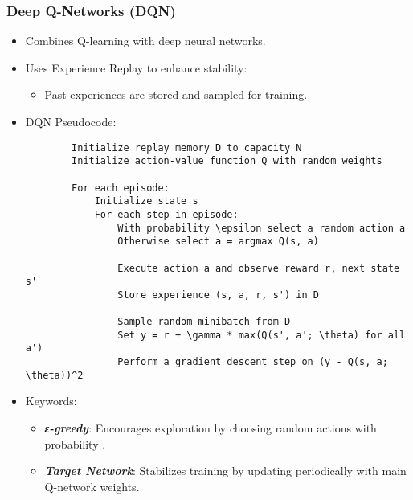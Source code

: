 \documentclass[aspectratio=169]{beamer}
\begin{document}
\begin{frame}[fragile]
    \frametitle{Deep Q-Networks (DQN)}
    \begin{itemize}
        \item Combines Q-learning with deep neural networks.
        \item Uses Experience Replay to enhance stability:
        \begin{itemize}
            \item Past experiences are stored and sampled for training.
        \end{itemize}
        
        \item DQN Pseudocode:
        \begin{lstlisting}
        Initialize replay memory D to capacity N
        Initialize action-value function Q with random weights
        
        For each episode:
            Initialize state s
            For each step in episode:
                With probability \epsilon select a random action a
                Otherwise select a = argmax Q(s, a)
                
                Execute action a and observe reward r, next state s'
                Store experience (s, a, r, s') in D
                
                Sample random minibatch from D
                Set y = r + \gamma * max(Q(s', a'; \theta) for all a')
                Perform a gradient descent step on (y - Q(s, a; \theta))^2
        \end{lstlisting}
        
        \item Keywords:
        \begin{itemize}
            \item \textbf{\emph{ε-greedy}}: Encourages exploration by choosing random actions with probability \epsilon.
            \item \textbf{\emph{Target Network}}: Stabilizes training by updating periodically with main Q-network weights.
        \end{itemize}
    \end{itemize}
\end{frame}
\end{document}
